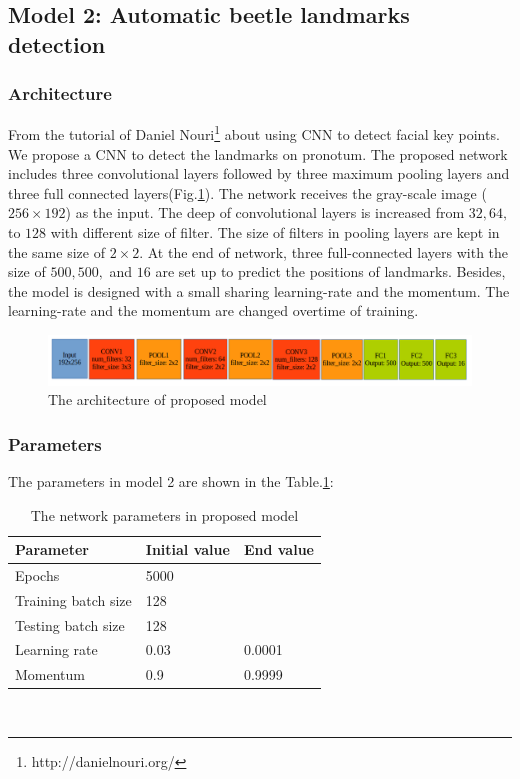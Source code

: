 \documentclass[12pt,a4paper]{article}
\begin{document}
\subsection{Model 2: Automatic beetle landmarks detection}
\subsubsection{Architecture}
From the tutorial of Daniel Nouri\footnote{http://danielnouri.org/} about using CNN to detect facial key points. We propose a CNN to detect the landmarks on pronotum. The proposed network includes three convolutional layers followed by three maximum pooling layers and three full connected layers(Fig.\ref{pmodel}). The network receives the gray-scale image ($256 \times 192$) as the input. The deep of convolutional layers is increased from $32, 64, $ to $ 128$ with different size of filter. The size of filters in pooling layers are kept in the same size of $2 \times 2$. At the end of network, three full-connected layers with the size of $500, 500, $ and $16$ are set up to predict the positions of landmarks. Besides, the model is designed with a small sharing learning-rate and the momentum. The learning-rate and the momentum are changed overtime of training.
\begin{figure}[h!]
	\centering
	\includegraphics[scale=0.4]{images/model3}
	\caption{The architecture of proposed model}
	\label{pmodel}
\end{figure}
\subsubsection{Parameters}
The parameters in model 2 are shown in the Table.\ref{model2parameters}:
\begin{table}[h!]
	\centering
	\begin{tabular}{l l l}
	Parameter & Initial value & End value \\ \hline
	Epochs & 5000 &  \\ \hline
	Training batch size & 128 & \\ \hline
	Testing batch size & 128 & \\ \hline
	Learning rate & 0.03 & 0.0001 \\ \hline
	Momentum & 0.9 & 0.9999 \\ \hline
	\end{tabular}
	\caption{The network parameters in proposed model}
	\label{model2parameters}
\end{table}~\\
\end{document}
